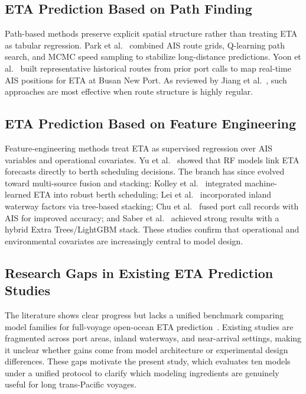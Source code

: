 \documentclass[sigconf,anonymous]{acmart}%
\begin{document}
\subsection{ETA Prediction Based on Path Finding}
Path-based methods preserve explicit spatial structure rather than treating ETA as tabular regression. Park et al.~\cite{parkVesselEstimatedTime2021} combined AIS route grids, Q-learning path search, and MCMC speed sampling to stabilize long-distance predictions. Yoon et al.~\cite{yoonEnhancingContainerVessel2023} built representative historical routes from prior port calls to map real-time AIS positions for ETA at Busan New Port. As reviewed by Jiang et al.~\cite{jiangPredictionVesselArrival2025}, such approaches are most effective when route structure is highly regular.

\subsection{ETA Prediction Based on Feature Engineering}
Feature-engineering methods treat ETA as supervised regression over AIS variables and operational covariates. Yu et al.~\cite{yuShipArrivalPrediction2018} showed that RF models link ETA forecasts directly to berth scheduling decisions. The branch has since evolved toward multi-source fusion and stacking: Kolley et al.~\cite{kolleyRobustBerthScheduling2022} integrated machine-learned ETA into robust berth scheduling; Lei et al.~\cite{leiPredictingVesselArrival2024} incorporated inland waterway factors via tree-based stacking; Chu et al.~\cite{chuVesselArrivalTime2025} fused port call records with AIS for improved accuracy; and Saber et al.~\cite{saberHighaccuracyPredictionVessels2025} achieved strong results with a hybrid Extra Trees/LightGBM stack. These studies confirm that operational and environmental covariates are increasingly central to model design.


\subsection{Research Gaps in Existing ETA Prediction Studies}
The literature shows clear progress but lacks a unified benchmark comparing model families for full-voyage open-ocean ETA prediction~\cite{jiangPredictionVesselArrival2025,nomanReviewVesselTime2025}. Existing studies are fragmented across port areas, inland waterways, and near-arrival settings, making it unclear whether gains come from model architecture or experimental design differences. These gaps motivate the present study, which evaluates ten models under a unified protocol to clarify which modeling ingredients are genuinely useful for long trans-Pacific voyages.
\end{document}
